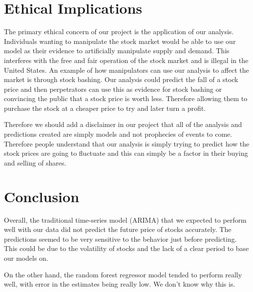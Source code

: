 \documentclass[11pt]{article}
\begin{document}
\section{Ethical Implications}

The primary ethical concern of our project is the application of our analysis. Individuals wanting to manipulate the 
stock market would be able to use our model as their evidence to artificially manipulate supply and demand. This 
interferes with the free and fair operation of the stock market and is illegal in the United States. An example of 
how manipulators can use our analysis to affect the market is through stock bashing. Our analysis could predict the 
fall of a stock price and then perpetrators can use this as evidence for stock bashing or convincing the public that a 
stock price is worth less. Therefore allowing them to purchase the stock at a cheaper price to try and later turn a profit. \par

Therefore we should add a disclaimer in our project that all of the analysis and predictions created are simply models and not prophecies of events to come. 
Therefore people understand that our analysis is simply trying to predict how the stock prices are going to fluctuate and this can simply be a factor in 
their buying and selling of shares.
\section{Conclusion}
Overall, the traditional time-series model (ARIMA) that we expected to perform well with our data did not predict the future price of stocks accurately. 
The predictions seemed to be very sensitive to the behavior just before predicting. 
This could be due to the volatility of stocks and the lack of a clear period to base our models on.\par

On the other hand, the random forest regressor model tended to perform really well, with error in the estimates being really low. We don't know why this is.
\end{document}
